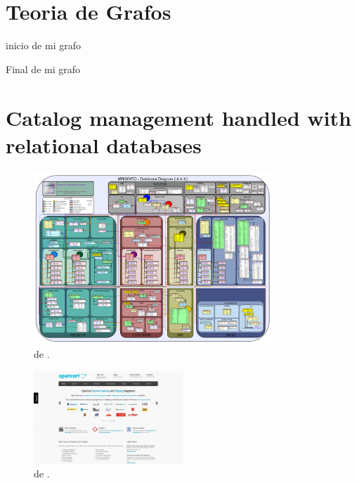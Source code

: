 
\appendix
\newpage

\chapter{Teoria de Grafos}\label{ap:apendice_graph_theory}
inicio de mi grafo \cite{book_introduction_graph_theory}

Final de mi grafo

\chapter{Catalog management handled with relational databases}\label{ap:apendice_ecommerce_catalog_relational}

\begin{figure}[h!]
	\centering
	\includegraphics[width=0.8\textwidth]{figuras/apendice/magento_sample_database_diagram.png}
	\caption{\schemasDB de \nameMagento \ecommerce \framework.}
	\label{ap:figure:catalog_magento}
\end{figure}

\begin{figure}[h!]
	\centering
	\includegraphics[width=0.5\textwidth]{figuras/apendice/openCartWebsite.jpg}
	\caption{\schemasDB de \ofBizNAME.}
	\label{ap:figure:catalog_ofbiz}
\end{figure}

